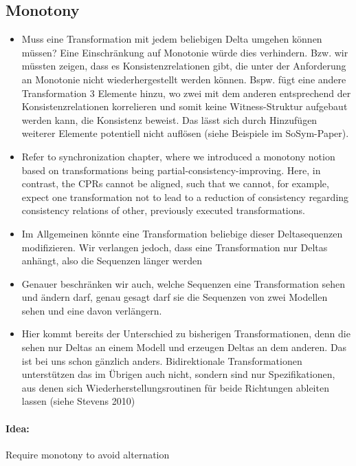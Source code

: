 \subsection{Monotony}

\begin{itemize}
    \item Muss eine Transformation mit jedem beliebigen Delta umgehen können müssen? Eine Einschränkung auf Monotonie würde dies verhindern. Bzw. wir müssten zeigen, dass es Konsistenzrelationen gibt, die unter der Anforderung an Monotonie nicht wiederhergestellt werden können. Bspw. fügt eine andere Transformation 3 Elemente hinzu, wo zwei mit dem anderen entsprechend der Konsistenzrelationen korrelieren und somit keine Witness-Struktur aufgebaut werden kann, die Konsistenz beweist. Das lässt sich durch Hinzufügen weiterer Elemente potentiell nicht auflösen (siehe Beispiele im SoSym-Paper).
    \item Refer to synchronization chapter, where we introduced a monotony notion based on transformations being partial-consistency-improving. Here, in contrast, the CPRs cannot be aligned, such that we cannot, for example, expect one transformation not to lead to a reduction of consistency regarding consistency relations of other, previously executed transformations.
\end{itemize}
\begin{itemize}
    \item Im Allgemeinen könnte eine Transformation beliebige dieser Deltasequenzen modifizieren. Wir verlangen jedoch, dass eine Transformation nur Deltas anhängt, also die Sequenzen länger werden
    \item Genauer beschränken wir auch, welche Sequenzen eine Transformation sehen und ändern darf, genau gesagt darf sie die Sequenzen von zwei Modellen sehen und eine davon verlängern.
    \item Hier kommt bereits der Unterschied zu bisherigen Transformationen, denn die sehen nur Deltas an einem Modell und erzeugen Deltas an dem anderen. Das ist bei uns schon gänzlich anders. Bidirektionale Transformationen unterstützen das im Übrigen auch nicht, sondern sind nur Spezifikationen, aus denen sich Wiederherstellungsroutinen für beide Richtungen ableiten lassen (siehe Stevens 2010)
\end{itemize}

\paragraph{Idea:} Require monotony to avoid alternation

